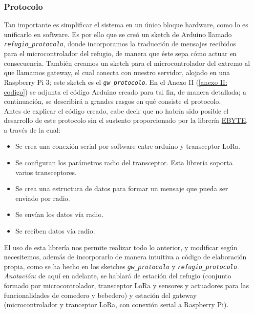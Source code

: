 \documentclass[12pt]{article}
\begin{document}
	\subsubsection{Protocolo}
	\noindent Tan importante es simplificar el sistema en un único bloque hardware, como lo es unificarlo en software. Es por ello que se creó un sketch de Arduino llamado \texttt{\textit{refugio\_protocolo}}, donde incorporamos la traducción de mensajes recibidos para el microcontrolador del refugio, de manera que éste sepa cómo actuar en consecuencia. También creamos un sketch para el microcontrolador del extremo al que llamamos gateway, el cual conecta con nuestro servidor, alojado en una Raspberry Pi 3; este sketch es el \texttt{\textit{gw\_protocolo}}.  En el Anexo II (\ref{anexo II: codigo}) se adjunta el código Arduino creado para tal fin, de manera detallada; a continuación, se describirá a grandes rasgos en qué consiste el protocolo.\\
	
	\noindent Antes de explicar el código creado, cabe decir que no habría sido posible el desarrollo de este protocolo sin el sustento proporcionado por la librería \href{https://github.com/KrisKasprzak/EBYTE}{EBYTE}, a través de la cual:
	
	\begin{itemize}
		\item Se crea una conexión serial por software entre arduino y transceptor LoRa.
		\item Se configuran los parámetros radio del transceptor. Esta librería soporta varios transceptores.
		\item Se crea una estructura de datos para formar un mensaje que pueda ser enviado por radio.
		\item Se envían los datos vía radio.
		\item Se reciben datos vía radio.
	\end{itemize}
	
	\noindent El uso de esta librería nos permite realizar todo lo anterior, y modificar según necesitemos, además de incorporarlo de manera intuitiva a código de elaboración propia, como se ha hecho en los sketches \texttt{\textit{gw\_protocolo}} y \texttt{\textit{refugio\_protocolo}}. \\
	
	\noindent \textit{Anotación}: de aquí en adelante, se hablará de estación del refugio (conjunto formado por microcontrolador, transceptor LoRa y sensores y actuadores para las funcionalidades de comedero y bebedero) y estación del gateway (microcontrolador y tranceptor LoRa, con conexión serial a Raspberry Pi). \\
	
\end{document}
